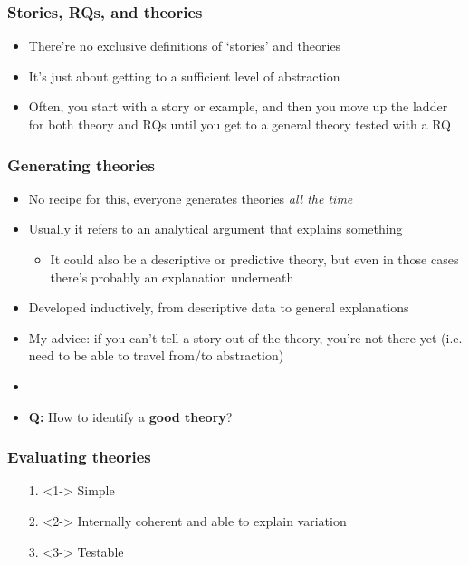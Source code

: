 \documentclass[aspectratio=43]{beamer}
\begin{document}
\begin{frame}
\frametitle{Stories, RQs, and theories}
\centering

\begin{itemize}
  \item There're no exclusive definitions of `stories' and theories
  \item It's just about getting to a sufficient level of abstraction
  \item Often, you start with a story or example, and then you move up the ladder for both theory and RQs until you get to a general theory tested with a RQ
\end{itemize}

\end{frame}

\begin{frame}
\frametitle{Generating theories}
\centering

\begin{itemize}
  \item<1-> No recipe for this, everyone generates theories \textit{all the time}
  \item Usually it refers to an analytical argument that explains something
  \begin{itemize}
    \item It could also be a descriptive or predictive theory, but even in those cases there's probably an explanation underneath
  \end{itemize}
  \item Developed inductively, from descriptive data to general explanations
  \item My advice: if you can't tell a story out of the theory, you're not there yet {\small (i.e. need to be able to travel from/to abstraction)}
  \item<2->[]
  \item<2-> \textbf{Q:} How to identify a \textbf{good theory}?
\end{itemize}

\end{frame}

\begin{frame}
\frametitle{Evaluating theories}
\centering

\begin{itemize}
  \item[1.]<1-> Simple
  \item[2.]<2-> Internally coherent and able to explain variation
  \item[3.]<3-> Testable
\end{itemize}

\end{frame}
\end{document}

